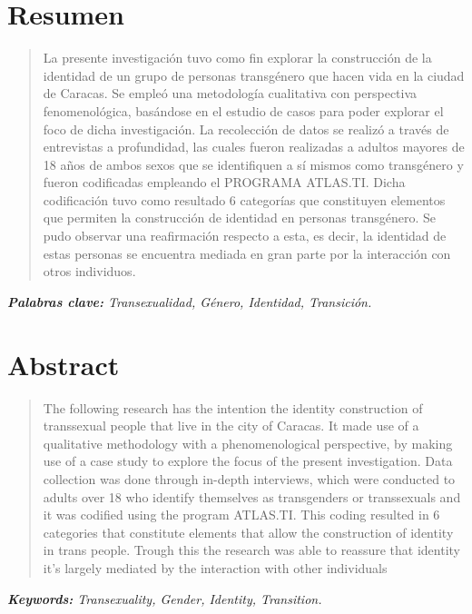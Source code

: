 
\chapter{Resumen}
\begin{center}
	\large \scshape \thetitle
\end{center}

\begin{quote}
La presente investigación tuvo como fin explorar la construcción de la identidad
de un grupo de personas transgénero que hacen vida en la ciudad de Caracas.
Se empleó una metodología cualitativa con perspectiva fenomenológica, basándose
en el estudio de casos para poder explorar el foco de dicha investigación.
La recolección de datos se realizó a través de entrevistas a profundidad, las
cuales fueron realizadas a adultos mayores de 18 años de ambos sexos que se
identifiquen a sí mismos como transgénero y fueron codificadas empleando el
PROGRAMA ATLAS.TI.
Dicha codificación tuvo como resultado 6 categorías que constituyen elementos
que permiten la construcción de identidad en personas transgénero.
Se pudo observar una reafirmación respecto a esta, es decir, la identidad de
estas personas se encuentra mediada en gran parte por la interacción con otros
individuos.
\end{quote}

\itshape \textbf{Palabras clave:} \normalfont Transexualidad, Género, Identidad,
Transición.

\chapter{Abstract}

\begin{center}
	\large \scshape \theengtitle
\end{center}

\begin{quote}
The following research has the intention the identity construction of
transsexual people that live in the city of Caracas.
It made use of a qualitative methodology with a phenomenological perspective, by
making use of a case study to explore the focus of the present investigation.
Data collection was done through in-depth interviews, which were conducted to
adults over 18 who identify themselves as transgenders or transsexuals and it
was codified using the program ATLAS.TI.
This coding resulted in 6 categories that constitute elements that allow the
construction of identity in trans people.
Trough this the research was able to reassure that identity it's largely
mediated by the interaction with other individuals

\end{quote}

\itshape \textbf{Keywords:} \normalfont Transexuality, Gender, Identity,
Transition.

\cleardoublepage